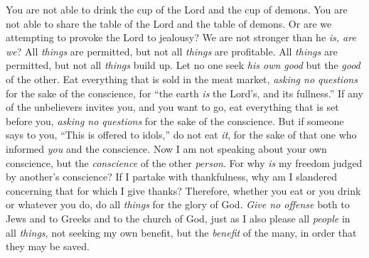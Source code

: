 \begin{biblechapter}
\verse You are not able to drink the cup of the Lord and the cup of demons. You are not able to share the table of the Lord and the table of demons.
\verse Or are we attempting to provoke the Lord to jealousy? We are not stronger than he \textit{is, are we}?
 All \textit{things} are permitted, but not all \textit{things} are profitable. All \textit{things} are permitted, but not all \textit{things} build up.
\verse Let no one seek \textit{his own good} but the \textit{good} of the other.
\verse Eat everything that is sold in the meat market, \textit{asking no questions} for the sake of the conscience,
\verse for “the earth \textit{is} the Lord’s, and its fullness.”
\verse If any of the unbelievers invites you, and you want to go, eat everything that is set before you, \textit{asking no questions} for the sake of the conscience.
\verse But if someone says to you, “This is offered to idols,” do not eat \textit{it}, for the sake of that one who informed \textit{you} and the conscience.
\verse Now I am not speaking about your own conscience, but the \textit{conscience} of the other \textit{person}. For why \textit{is} my freedom judged by another’s conscience?
\verse If I partake with thankfulness, why am I slandered concerning that for which I give thanks?
\verse Therefore, whether you eat or you drink or whatever you do, do all \textit{things} for the glory of God.
\verse \textit{Give no offense} both to Jews and to Greeks and to the church of God,
\verse just as I also please all \textit{people} in all \textit{things}, not seeking my own benefit, but the \textit{benefit} of the many, in order that they may be saved.
\end{biblechapter}

